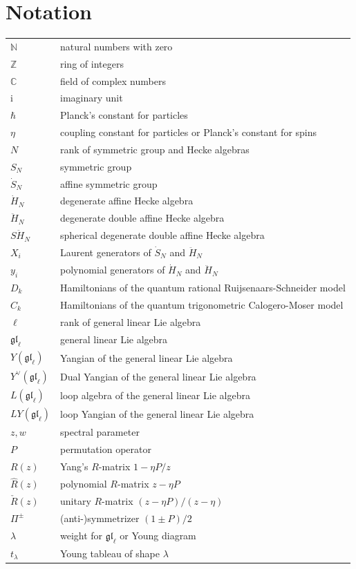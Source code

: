 \documentclass[11pt]{report}
\theoremstyle{definition}
\theoremstyle{remark}
\theoremstyle{remark}
\newcommand{\N}{\mathbb{N}}
\newcommand{\Z}{\mathbb{Z}}
\newcommand{\C}{\mathbb{C}}
\newcommand{\I}{\mathrm{i}}
\begin{document}

\chapter*{Notation}\label{chapter:notation}

\begin{tabular}{l|l}
$\N$ & natural numbers with zero \\
$\Z$ & ring of integers \\
$\C$ & field of complex numbers \\
$\I$ & imaginary unit \\
$\hbar$ & Planck's constant for particles \\
$\eta$ & coupling constant for particles or Planck's constant for spins \\
$N$ & rank of symmetric group and Hecke algebras \\
$S_N$ & symmetric group \\
$\dot S_N$ & affine symmetric group \\
$\dot H_N$ & degenerate affine Hecke algebra \\
$\ddot H_N$ & degenerate double affine Hecke algebra \\
$S\ddot H_N$ & spherical degenerate double affine Hecke algebra \\
$X_i$ & Laurent generators of $\dot S_N$ and $\ddot H_N$ \\
$y_i$ & polynomial generators of $\dot H_N$ and $\ddot H_N$ \\
$D_k$ & Hamiltonians of the quantum rational Ruijsenaars-Schneider model \\
$C_k$ & Hamiltonians of the quantum trigonometric Calogero-Moser model \\
$\ell$ & rank of general linear Lie algebra \\
$\mathfrak{gl}_\ell$ & general linear Lie algebra \\
$Y(\mathfrak{gl}_\ell)$ & Yangian of the general linear Lie algebra \\
$Y^\vee(\mathfrak{gl}_\ell)$ & Dual Yangian of the general linear Lie algebra \\
$L(\mathfrak{gl}_\ell)$ & loop algebra of the general linear Lie algebra \\
$LY(\mathfrak{gl}_\ell)$ & loop Yangian of the general linear Lie algebra \\
$z,w$ & spectral parameter \\
$P$ & permutation operator \\
$R(z)$ & Yang's $R$-matrix $1-\eta P/z$ \\
$\hat R(z)$ & polynomial $R$-matrix $z-\eta P$ \\
$\check R(z)$ & unitary $R$-matrix $(z-\eta P)/(z-\eta)$ \\
$\Pi^\pm$ & (anti-)symmetrizer $(1 \pm P)/2$ \\
$\lambda$ & weight for $\mathfrak{gl}_\ell$ or Young diagram \\
$t_\lambda$ & Young tableau of shape $\lambda$
\end{tabular}
\end{document}
